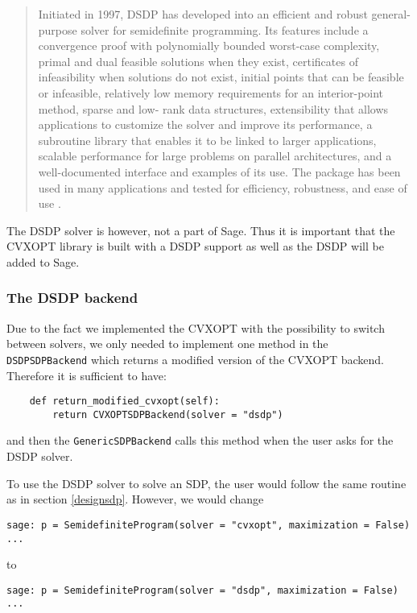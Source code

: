 \begin{quotation}
Initiated in 1997, DSDP has developed into an efficient and
robust general-purpose solver for semidefinite programming. Its features include a convergence
proof with polynomially bounded worst-case complexity, primal and dual feasible solutions when
they exist, certificates of infeasibility when solutions do not exist, initial points that can be feasible
or infeasible, relatively low memory requirements for an interior-point method, sparse and low-
rank data structures, extensibility that allows applications to customize the solver and improve
its performance, a subroutine library that enables it to be linked to larger applications, scalable
performance for large problems on parallel architectures, and a well-documented interface and
examples of its use. The package has been used in many applications and tested for efficiency,
robustness, and ease of use \cite{dsdp5}.
\end{quotation}

The DSDP solver is however, not a part of Sage. Thus it is important that the CVXOPT library is built with a DSDP support as well as the DSDP will be added to Sage. 

\subsubsection{The DSDP backend}
Due to the fact we implemented the CVXOPT with the possibility to switch between solvers, we only needed to implement one method in the \texttt{DSDPSDPBackend} which returns a modified version of the CVXOPT backend. Therefore it is sufficient to have:

\begin{verbatim}
    def return_modified_cvxopt(self):
        return CVXOPTSDPBackend(solver = "dsdp")
\end{verbatim}
and then the \texttt{GenericSDPBackend} calls this method when the user asks for the DSDP solver.

To use the DSDP solver to solve an SDP, the user would follow the same routine as in section \ref{designsdp}. However, we would change  
\begin{verbatim}
sage: p = SemidefiniteProgram(solver = "cvxopt", maximization = False)
...
\end{verbatim}
to
\begin{verbatim}
sage: p = SemidefiniteProgram(solver = "dsdp", maximization = False)
...
\end{verbatim}

